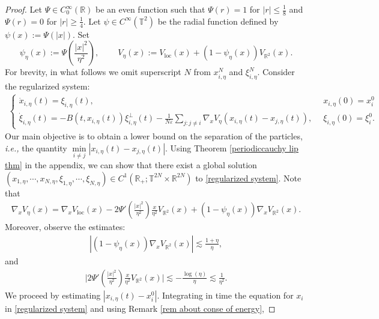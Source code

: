 \documentclass[11pt,reqno]{amsart}
\numberwithin{equation}{section}
\begin{document}
\begin{proof}
Let $\Psi\in C^{\infty}_{0}(\mathbb{R})$ be an even function such that $\Psi(r)=1$ for $\left| r \right|\leq \frac{1}{8}$ and $\Psi(r)=0$ for $\left| r \right|\geq \frac{1}{4}$. 
Let $\psi\in C^{\infty}(\mathbb{T}^{2})$ be the radial function defined 
by $\psi(x) := \Psi(\left| x \right|)$. Set  
\[
\psi_{\eta}(x):=\Psi(\frac{\left|x\right|^{2}}{\eta^{2}}), \qquad\ 
V_{\eta}(x):= V_{\mathrm{loc}}(x)+(1-\psi_{\eta}(x))V_{\mathbb{R}^{2}}(x). 
\]
For brevity, in what follows we omit superscript $N$ from $x_{i,\eta}^{N}$ and $\xi_{i,\eta}^{N}$. Consider the regularized system: 
\begin{align}
\begin{cases}
\dot x_{i,\eta}(t)=\xi_{i,\eta}(t),\ &x_{i,\eta}(0)=x_{i}^{0}\\[1mm]
\dot \xi_{i,\eta}(t)=-B(t,x_{i,\eta}(t))\xi_{i,\eta}^{\perp}(t)-\frac{1}{N\varepsilon}\underset{j:j\neq i}{\sum}\nabla_{x} V_{\eta}(x_{i,\eta}(t)-x_{j,\eta}(t)), \,\,\, &\xi_{i,\eta}(0)=\xi_{i}^{0}. 
\end{cases}
\label{regularized system}
\end{align}
Our main objective is to obtain a lower bound on the separation of the particles, {\it i.e.,} the quantity $\underset{i\neq j}{\min}\left\vert x_{i,\eta}(t)-x_{j,\eta}(t)\right\vert$. 
Using Theorem \ref{periodiccauchy lip thm} in the appendix, we can show that there exist a  global solution $(x_{1,\eta},\cdots\!,x_{N,\eta},\xi_{1,\eta},\cdots\!,\xi_{N,\eta})\in C^{1}(\mathbb{R}_{+};\mathbb{T}^{2N}\times \mathbb{R}^{2N})$ to \eqref{regularized system}. Note that 
\begin{align*}
\nabla_{x} V_{\eta}(x)=\nabla_{x}V_{\mathrm{loc}}(x)-2\Psi'(\frac{\left\vert x\right\vert^{2}}{\eta^{2}})\frac{x}{\eta^{2}}V_{\mathbb{R}^{2}}(x)+(1-\psi_{\eta}(x))\nabla_{x} V_{\mathbb{R}^{2}}(x). \end{align*}
Moreover, observe the estimates: 
\begin{align}
\left\vert (1-\psi_{\eta}(x))\nabla_{x} V_{\mathbb{R}^{2}}(x)\right\vert\lesssim \frac{1+\eta}{\eta}, \label{estimate for cutoff}       
\end{align}
and 
\begin{align}
\Big\vert 2\Psi'(\frac{\left\vert x\right\vert^{2}}{\eta^{2}})\frac{x}{\eta^{2}}V_{\mathbb{R}^{2}}(x)\Big\vert
\lesssim -\frac{\log(\eta)}{\eta}\lesssim \frac{1}{\eta^{2}}. \label{est for cutoff 2}      
\end{align}
We proceed by estimating $\left|x_{i,\eta}(t)-x_{i}^{0}\right|$. Integrating in time the equation for $x_{i}$ in \eqref{regularized system} and using Remark \ref{rem about conse of energy},

\end{proof}
\end{document}
